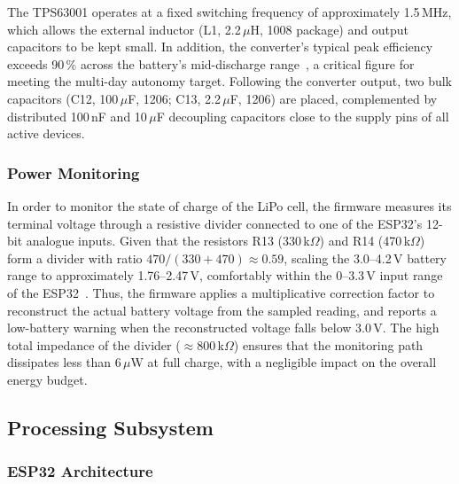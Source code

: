 \documentclass[english,bachelor]{tfgitic}[2026/01/22]
\begin{document}
The TPS63001 operates at a fixed switching frequency of approximately 1.5\,MHz,
which allows the external inductor (L1, 2.2\,$\mu$H, 1008 package) and output
capacitors to be kept small. In addition, the converter's typical peak efficiency exceeds 90\,\%
across the battery's mid-discharge range~\cite{ti2012tps63001}, a critical figure for
meeting the multi-day autonomy target. Following the converter output, two bulk capacitors (C12, 100\,$\mu$F, 1206;
C13, 2.2\,$\mu$F, 1206) are placed, complemented by
distributed 100\,nF and 10\,$\mu$F decoupling capacitors close to the supply pins of
all active devices.

\subsubsection{Power Monitoring}
\label{subsec:hw_batmon}

In order to monitor the state of charge of the LiPo cell, the firmware measures its terminal
voltage through a resistive divider connected to one of the ESP32's 12-bit analogue
inputs. Given that the resistors R13 (330\,k$\Omega$) and R14 (470\,k$\Omega$) form a divider with
ratio $470/(330+470)\approx0.59$, scaling the 3.0--4.2\,V battery range to
approximately 1.76--2.47\,V, comfortably within the 0--3.3\,V  input range of
the ESP32~\cite{espressif2023esp32trm}. Thus, the firmware applies a multiplicative
correction factor to reconstruct the actual battery voltage from the sampled reading,
and reports a low-battery warning when the reconstructed voltage falls below 3.0\,V.
The high total impedance of the divider ($\approx$800\,k$\Omega$) ensures that the
monitoring path dissipates less than 6\,$\mu$W at full charge, with a negligible
impact on the overall energy budget.


\subsection{Processing Subsystem}
\label{sec:hw_processing}


\subsubsection{ESP32 Architecture}
\label{subsec:hw_esp32}
\end{document}
